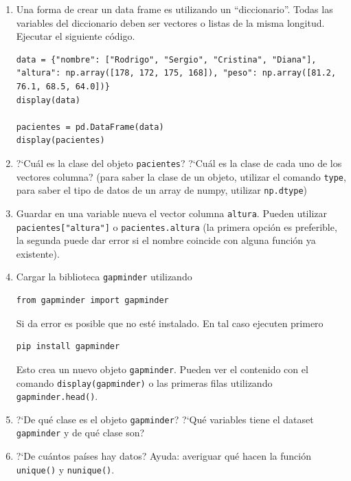 \documentclass[a4paper,11pt]{article}
\theoremstyle{definition}
\begin{document}
\begin{enumerate}
\item Una forma de crear un data frame es utilizando un ``diccionario''. Todas las variables del diccionario deben ser vectores o listas de la misma longitud. Ejecutar el siguiente c\'odigo.

\begin{lstlisting}
data = {"nombre": ["Rodrigo", "Sergio", "Cristina", "Diana"], "altura": np.array([178, 172, 175, 168]), "peso": np.array([81.2, 76.1, 68.5, 64.0])}
display(data)

pacientes = pd.DataFrame(data)
display(pacientes)
\end{lstlisting}

\item ?`Cuál es la clase del objeto \lstinline{pacientes}? ?`Cuál es la clase de cada uno de los vectores columna? (para saber la clase de un objeto, utilizar el comando \lstinline{type}, para saber el tipo de datos de un array de numpy, utilizar \lstinline{np.dtype})

\item Guardar en una variable nueva el vector columna \lstinline{altura}. Pueden utilizar \lstinline{pacientes["altura"]} o \lstinline{pacientes.altura} (la primera opci\'on es preferible, la segunda puede dar error si el nombre coincide con alguna funci\'on ya existente).

\item Cargar la biblioteca \lstinline{gapminder} utilizando
\begin{lstlisting}
from gapminder import gapminder
\end{lstlisting}

Si da error es posible que no est\'e instalado. En tal caso ejecuten primero
\begin{lstlisting}
pip install gapminder
\end{lstlisting}

Esto crea un nuevo objeto \lstinline{gapminder}. Pueden ver el contenido con el comando \lstinline{display(gapminder)} o las primeras filas utilizando \lstinline{gapminder.head()}.

\item ?`De qué clase es el objeto \lstinline{gapminder}? ?`Qu\'e variables tiene el dataset \lstinline{gapminder} y de qu\'e clase son?

\item ?`De cu\'antos pa\'ises hay datos? Ayuda: averiguar qu\'e hacen la funci\'on \lstinline{unique()} y \lstinline{nunique()}.


\end{enumerate}
\end{document}
